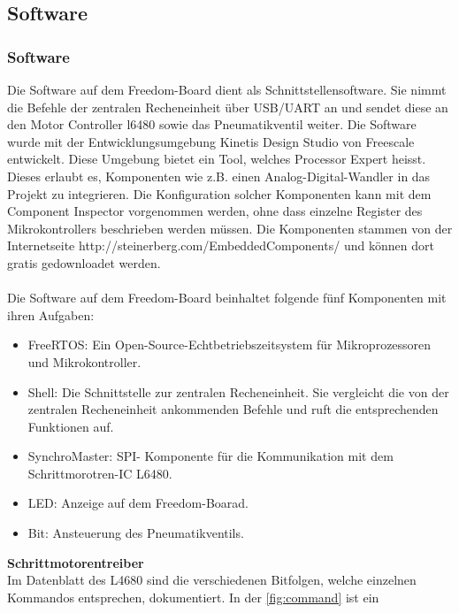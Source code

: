     \subsection{Software}   \label{ch:Software} 
    \fi
    \ifEMBED
    \subsubsection{Software} \label{ch:Softwarea}
    \fi
    Die Software auf dem Freedom-Board dient als Schnittstellensoftware. Sie 
    nimmt die Befehle der zentralen Recheneinheit über USB/UART an und sendet 
    diese an den Motor Controller l6480 sowie das Pneumatikventil weiter. Die 
    Software wurde mit der Entwicklungsumgebung Kinetis Design Studio von 
    Freescale entwickelt. Diese Umgebung bietet ein Tool, welches Processor 
    Expert heisst. Dieses erlaubt es, Komponenten wie z.B. einen 
    Analog-Digital-Wandler in das Projekt zu integrieren. Die Konfiguration 
    solcher Komponenten kann mit dem Component Inspector vorgenommen werden, 
    ohne dass einzelne Register des Mikrokontrollers beschrieben werden 
    müssen. Die Komponenten stammen von der Internetseite 
    http://steinerberg.com/EmbeddedComponents/ und können dort gratis 
    gedownloadet werden.
    \\\\
    Die Software auf dem Freedom-Board beinhaltet folgende fünf Komponenten 
    mit ihren Aufgaben: 
    \begin{itemize}
        \item FreeRTOS:         Ein Open-Source-Echtbetriebszeitsystem für 
            Mikroprozessoren und Mikrokontroller.  
        \item Shell:            Die Schnittstelle zur zentralen Recheneinheit. 
            Sie vergleicht die von der zentralen Recheneinheit ankommenden 
            Befehle und ruft die entsprechenden Funktionen auf. 
        \item SynchroMaster:    SPI- Komponente für die Kommunikation mit dem 
            Schrittmorotren-IC L6480. 
        \item LED:              Anzeige auf dem Freedom-Boarad.
        \item Bit:              Ansteuerung des Pneumatikventils.
    \end{itemize}
    \textbf{Schrittmotorentreiber}\\
    Im Datenblatt des L4680 sind die verschiedenen Bitfolgen, welche einzelnen 
    Kommandos entsprechen, dokumentiert. In der \autoref{fig:command} ist ein 
